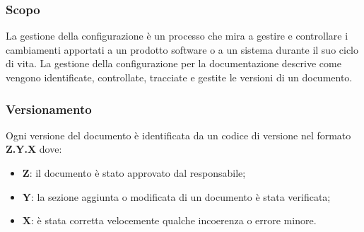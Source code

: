 \subsubsection{Scopo}
La gestione della configurazione è un processo che mira a gestire e controllare
i cambiamenti apportati a un prodotto software o a un sistema durante il suo
ciclo di vita. La gestione della configurazione per la documentazione descrive
come vengono identificate, controllate, tracciate e gestite le versioni di un
documento.
\subsubsection{Versionamento}
Ogni versione del documento è identificata da un codice di versione nel formato
\textbf{Z.Y.X} dove:
\begin{itemize}
      \item \textbf{Z}: il documento è stato approvato dal responsabile;
      \item \textbf{Y}: la sezione aggiunta o modificata di un documento è stata verificata;
      \item \textbf{X}: è stata corretta velocemente qualche incoerenza o errore minore.
\end{itemize}
